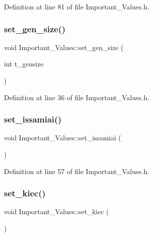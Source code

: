 Definition at line 81 of file Important\+\_\+\+Values.\+h.

\mbox{\label{class_important___values_aef6d6a9cd333cce492a244df5aa6cdf9}} 
\subsubsection{\texorpdfstring{set\_gen\_size()}{set\_gen\_size()}}
{\footnotesize\ttfamily void Important\+\_\+\+Values\+::set\+\_\+gen\+\_\+size (\begin{DoxyParamCaption}\item[{int}]{t\+\_\+gensize }\end{DoxyParamCaption})\hspace{0.3cm}{\ttfamily [inline]}}



Definition at line 36 of file Important\+\_\+\+Values.\+h.

\mbox{\label{class_important___values_a800b5715cde55bd471df46690be34839}} 
\subsubsection{\texorpdfstring{set\_issamiai()}{set\_issamiai()}}
{\footnotesize\ttfamily void Important\+\_\+\+Values\+::set\+\_\+issamiai (\begin{DoxyParamCaption}{ }\end{DoxyParamCaption})\hspace{0.3cm}{\ttfamily [inline]}}



Definition at line 57 of file Important\+\_\+\+Values.\+h.

\mbox{\label{class_important___values_a2e4e4a78f8f95954f54f3c6f9d1e887b}} 
\subsubsection{\texorpdfstring{set\_kiec()}{set\_kiec()}}
{\footnotesize\ttfamily void Important\+\_\+\+Values\+::set\+\_\+kiec (\begin{DoxyParamCaption}{ }\end{DoxyParamCaption})\hspace{0.3cm}{\ttfamily [inline]}}



